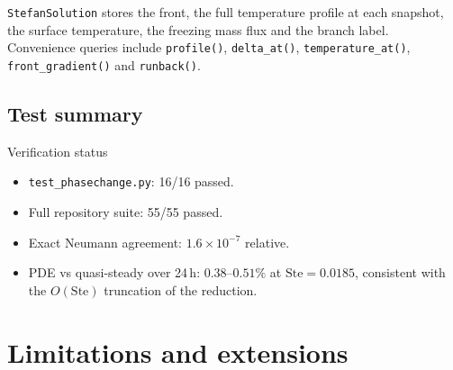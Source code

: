 \documentclass[11pt,a4paper]{article}
\begin{document}
\texttt{StefanSolution} stores the front, the full temperature profile at each snapshot,
the surface temperature, the freezing mass flux and the branch label. Convenience queries
include \texttt{profile()}, \texttt{delta\_at()}, \texttt{temperature\_at()},
\texttt{front\_gradient()} and \texttt{runback()}.

\subsection{Test summary}

\begin{resultbox}{Verification status}
\begin{itemize}[leftmargin=1.2em,itemsep=2pt]
  \item \texttt{test\_phasechange.py}: 16/16 passed.
  \item Full repository suite: 55/55 passed.
  \item Exact Neumann agreement: $1.6\times10^{-7}$ relative.
  \item PDE vs quasi-steady over 24\,h: $0.38$--$0.51\%$ at $\mathrm{Ste}=0.0185$,
        consistent with the $O(\mathrm{Ste})$ truncation of the reduction.
\end{itemize}
\end{resultbox}

\section{Limitations and extensions}\label{sec:limits}
\end{document}
